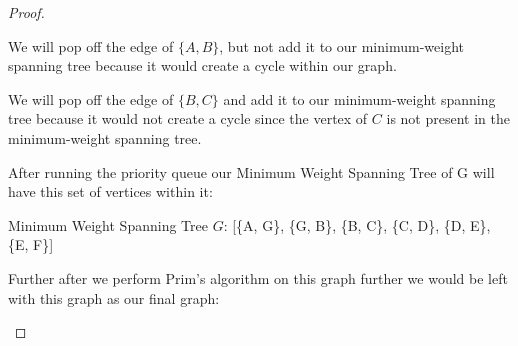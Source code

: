 \documentclass[11pt]{article}
\theoremstyle{definition}
\theoremstyle{definition}
\theoremstyle{definition}
\begin{document}
\begin{proof}
\begin{center}
We will pop off the edge of $\{A, B\}$, but not add it to our minimum-weight spanning tree because it would create a cycle within our graph.
\end{center}

\begin{center}
We will pop off the edge of $\{B, C\}$ and add it to our minimum-weight spanning tree because it would not create a cycle since the vertex of $C$ is not present in the minimum-weight spanning tree.
\end{center}

After running the priority queue our Minimum Weight Spanning Tree of G will have this set of vertices within it: \\
\begin{center}
Minimum Weight Spanning Tree $G$: [\{A, G\}, \{G, B\}, \{B, C\}, \{C, D\}, \{D, E\}, \{E, F\}]
\end{center}
Further after we perform Prim's algorithm on this graph further we would be left with this graph as our final graph: \\
\begin {center}
\end{center}

\end{proof}





\newpage
\end{document}
